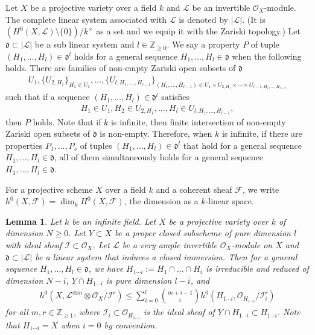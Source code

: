 \documentclass[12pt]{amsart}
\theoremstyle{plain}
\newtheorem{lemma}[theorem]{Lemma}
\theoremstyle{definition}
\numberwithin{equation}{section}
\def\Z{{\mathbb Z}}
\def\dd{{ \mathfrak{d}}}
\def\O{{ \mathcal{O}}}
\def\I{{ \mathcal{I}}}
\def\L{{ \mathcal{L}}}
\begin{document}
Let $X$ be a projective variety over a field $k$
and $ \mathcal{L}$ be an invertible $\O_{X}$-module.
The complete linear system associated with $ \mathcal{L}$ is denoted by
$| \mathcal{L}|$. (It is $(H^{0}(X, \mathcal{L}) \setminus \{0\})/k^{\times}$ as a set and we equip it with the Zariski topology.)
Let  $ \dd \subset | \mathcal{L}|$ be a sub linear system and $l \in \Z_{\geq 0}$.
We say a property $P$ of tuple $(H_{1},\dots , H_{l}) \in \dd^{l}$ holds for 
a general sequence $H_{1}, \dots , H_{l} \in \dd$ when the following holds.
There are families of non-empty Zariski open subsets of $\dd$
\begin{align}
U_{1}, \{ U_{2, H_{1}} \}_{H_{1} \in U_{1}}, \dots, 
\{ U_{l, H_{1},\dots, H_{l-1}}\}_{(H_{1}, \dots, H_{l-1}) \in U_{1} \times U_{2, H_{1}} \times \cdots \times U_{l-1, H_{1},\dots, H_{l-2}}}
\end{align} 
such that if a sequence $(H_{1},\dots , H_{l}) \in \dd^{l}$ satisfies
\begin{align}
H_{1} \in U_{1}, H_{2} \in U_{2, H_{1}}, \dots, H_{l} \in U_{l, H_{1}, \dots, H_{l-1}},
\end{align}
then $P$ holds.
Note that if $k$ is infinite, then finite intersection of non-empty Zariski open subsets of $\dd$
is non-empty. Therefore, when $k$ is infinite, if there are properties $P_{1}, \dots, P_{s}$ of tuples $(H_{1},\dots , H_{l}) \in \dd^{l}$
that hold for a general sequence $H_{1}, \dots , H_{l} \in \dd$, all of them simultaneously holds for a general sequence $H_{1}, \dots , H_{l} \in \dd$.

For a projective scheme $X$ over a field $k$ and a coherent sheaf $ \mathcal{F}$,
we write $h^{0}(X, \mathcal{F})= \dim_{k}H^{0}(X, \mathcal{F})$, the dimension as a $k$-linear space.

\vspace{1em}

\begin{lemma}\label{lem:glsecthick}
Let $k$ be an infinite field.
Let $X$ be a projective variety over $k$ of dimension $N \geq 0$.
Let $Y \subset X$ be a proper closed subscheme of pure dimension $l$ with ideal sheaf $ \I \subset \O_{X}$.
Let $ \mathcal{L}$ be a very ample invertible $\O_{X}$-module on $X$
and $\dd \subset |\L|$ be a linear system that induces a closed immersion.
Then for a general sequence $H_{1}, \dots, H_{l} \in \dd$, we have
$H_{1\cdots i}:= H_{1} \cap \dots \cap H_{i}$ is irreducible and reduced of dimension $N-i$,
$Y \cap H_{1\cdots i}$ is pure dimension $l - i$, and
\begin{align}
h^{0}(X, \mathcal{L}^{\otimes m} \otimes \O_{X}/\I^{r}) \leq \sum_{i=0}^{l} \binom{m+i-1}{i} h^{0}(H_{1\cdots i}, \O_{H_{1\cdots i}}/\I_{i}^{r})
\end{align}
for all $m, r \in \Z_{\geq 1}$,
where $\I_{i} \subset \O_{H_{1\cdots i}}$ is the ideal sheaf of $Y \cap H_{1\cdots i} \subset H_{1\cdots i}$.
Note that $H_{1\cdots i} = X$ when $i=0$ by convention.
\end{lemma}
\end{document}
